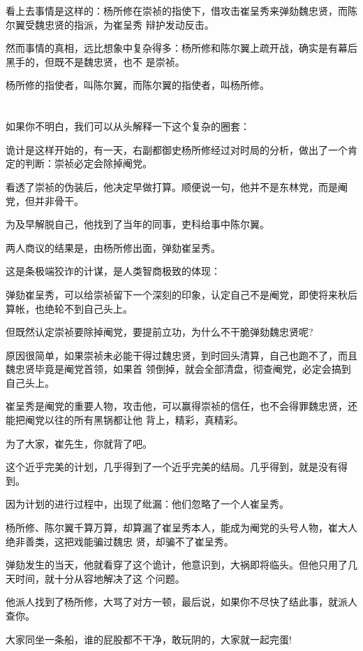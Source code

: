 \documentclass[11pt,a4paper,onecolumn]{article}
\begin{document}
看上去事情是这样的：杨所修在崇祯的指使下，借攻击崔呈秀来弹劾魏忠贤，而陈尔翼受魏忠贤的指派，为崔呈秀
辩护发动反击。

然而事情的真相，远比想象中复杂得多：杨所修和陈尔翼上疏开战，确实是有幕后黑手的，但既不是魏忠贤，也不
是崇祯。

杨所修的指使者，叫陈尔翼，而陈尔翼的指使者，叫杨所修。

\section[\thesection]{}

如果你不明白，我们可以从头解释一下这个复杂的圈套：

诡计是这样开始的，有一天，右副都御史杨所修经过对时局的分析，做出了一个肯定的判断：崇祯必定会除掉阉党。

看透了崇祯的伪装后，他决定早做打算。顺便说一句，他并不是东林党，而是阉党，但并非骨干。

为及早解脱自己，他找到了当年的同事，吏科给事中陈尔翼。

两人商议的结果是，由杨所修出面，弹劾崔呈秀。

这是条极端狡诈的计谋，是人类智商极致的体现：

弹劾崔呈秀，可以给崇祯留下一个深刻的印象，认定自己不是阉党，即使将来秋后算帐，也绝轮不到自己头上。

但既然认定崇祯要除掉阉党，要提前立功，为什么不干脆弹劾魏忠贤呢?

原因很简单，如果崇祯未必能干得过魏忠贤，到时回头清算，自己也跑不了，而且魏忠贤毕竟是阉党首领，如果首
领倒掉，就会全部清盘，彻查阉党，必定会搞到自己头上。

崔呈秀是阉党的重要人物，攻击他，可以赢得崇祯的信任，也不会得罪魏忠贤，还能把阉党以往的所有黑锅都让他
背上，精彩，真精彩。

为了大家，崔先生，你就背了吧。

这个近乎完美的计划，几乎得到了一个近乎完美的结局。几乎得到，就是没有得到。

因为计划的进行过程中，出现了纰漏：他们忽略了一个人\myrule 崔呈秀。

杨所修、陈尔翼千算万算，却算漏了崔呈秀本人，能成为阉党的头号人物，崔大人绝非善类，这把戏能骗过魏忠
贤，却骗不了崔呈秀。

弹劾发生的当天，他就看穿了这个诡计，他意识到，大祸即将临头。但他只用了几天时间，就十分从容地解决了这
个问题。

他派人找到了杨所修，大骂了对方一顿，最后说，如果你不尽快了结此事，就派人查你。

大家同坐一条船，谁的屁股都不干净，敢玩阴的，大家就一起完蛋!
\end{document}

